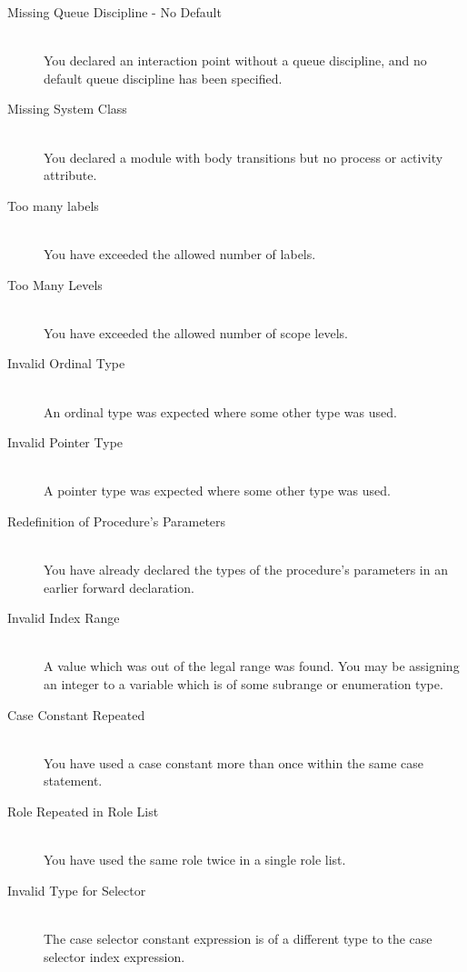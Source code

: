 \begin{description}
\item[Missing Queue Discipline - No Default]\mbox{}\\
You declared an interaction point without a queue discipline, and
no default queue discipline has been specified.

\item[Missing System Class]\mbox{}\\
You declared a module with body transitions but no process or
activity attribute.

\item[Too many labels]\mbox{}\\
You have exceeded the allowed number of labels.

\item[Too Many Levels]\mbox{}\\
You have exceeded the allowed number of scope levels.

\item[Invalid Ordinal Type]\mbox{}\\
An ordinal type was expected where some other type was used.

\item[Invalid Pointer Type]\mbox{}\\
A pointer type was expected where some other type was used.

\item[Redefinition of Procedure's Parameters]\mbox{}\\
You have already declared the types of the procedure's parameters in
an earlier forward declaration.

\item[Invalid Index Range]\mbox{}\\
A value which was out of the legal range was found. You may be
assigning an integer to a variable which is of some subrange or
enumeration type.

\item[Case Constant Repeated]\mbox{}\\
You have used a case constant more than once within the same case
statement.

\item[Role Repeated in Role List]\mbox{}\\
You have used the same role twice in a single role list.

\item[Invalid Type for Selector]\mbox{}\\
The case selector constant expression is of a different type to the
case selector index expression.


\end{description}
